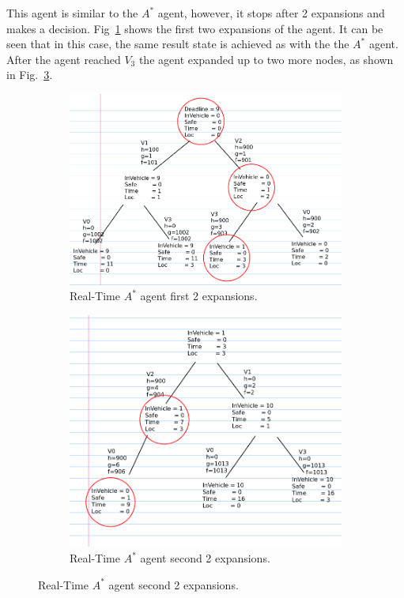 \documentclass{article}                     %
\begin{document}
	This agent is similar to the $ A^* $ agent, however, it stops after 2 expansions and makes a decision. Fig~\ref{fig:q2c1} shows the first two expansions of the agent. It can be seen that in this case, the same result state is achieved as with the the $ A^* $ agent. After the agent reached $ V_3 $ the agent expanded up to two more nodes, as shown in Fig.~\ref{fig:q2c2}.
	\begin{figure}
		\centering
		\begin{subfigure}[b]{0.4\textwidth}
			\includegraphics[width=\textwidth]{q2_c_1}
			\caption{Real-Time $ A^* $ agent first 2 expansions.}
			\label{fig:q2c1}
		\end{subfigure}
		\begin{subfigure}[b]{0.4\textwidth}
			\includegraphics[width=\textwidth]{q2_c_2}
			\caption{Real-Time $ A^* $ agent second 2 expansions.}
			\label{fig:q2c2}
		\end{subfigure}
	
	\end{figure}
\end{document}
